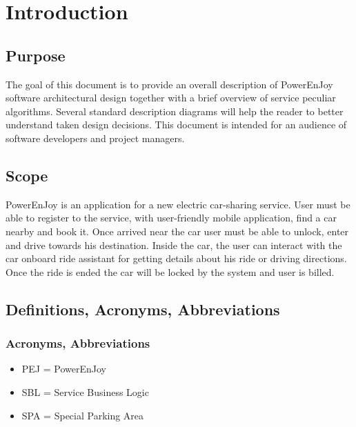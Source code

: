 \section{Introduction}

\subsection{Purpose}
The goal of this document is to provide an overall description of PowerEnJoy software architectural design together with a brief overview of service peculiar algorithms. Several standard description diagrams will help the reader to better understand taken design decisions. This document is intended for an audience of software developers and project managers.

\subsection{Scope}
PowerEnJoy is an application for a new electric car-sharing service.\newline
User must be able to register to the service, with user-friendly mobile application, find a car nearby and book it. Once arrived near the car user must be able to unlock, enter and drive towards his destination.\newline
Inside the car, the user can interact with the car onboard ride assistant for getting details about his ride or driving directions.
\newline
Once the ride is ended the car will be locked by the system and user is billed.

\subsection{Definitions, Acronyms, Abbreviations}
\subsubsection{Acronyms, Abbreviations}
\begin{itemize}
    \item PEJ = PowerEnJoy
    \item SBL = Service Business Logic
    \item SPA = Special Parking Area
\end{itemize}
